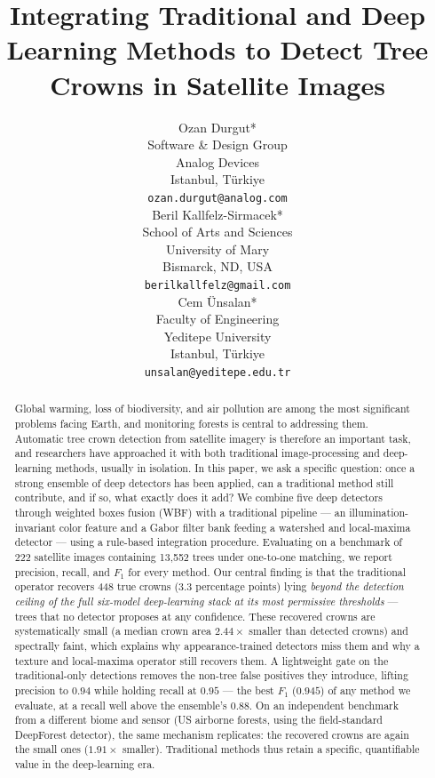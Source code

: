 \documentclass{article}
\title{Integrating Traditional and Deep Learning Methods to Detect Tree Crowns in Satellite Images}
\author{
  Ozan Durgut* \\
  Software \& Design Group \\
  Analog Devices \\
  Istanbul, Türkiye\\
  \texttt{ozan.durgut@analog.com} \\
   \And
  Beril Kallfelz-Sirmacek* \\
  School of Arts and Sciences \\
  University of Mary \\
  Bismarck, ND, USA\\
  \texttt{berilkallfelz@gmail.com} \\
  \And
  Cem Ünsalan*\\
  Faculty of Engineering \\
  Yeditepe University \\
  Istanbul, Türkiye\\
  \texttt{unsalan@yeditepe.edu.tr} \\
}
\begin{document}
\maketitle


\begin{abstract}
Global warming, loss of biodiversity, and air pollution are among the most significant problems facing Earth, and monitoring forests is central to addressing them. Automatic tree crown detection from satellite imagery is therefore an important task, and researchers have approached it with both traditional image-processing and deep-learning methods, usually in isolation. In this paper, we ask a specific question: once a strong ensemble of deep detectors has been applied, can a traditional method still contribute, and if so, what exactly does it add? We combine five deep detectors through weighted boxes fusion (WBF) with a traditional pipeline --- an illumination-invariant color feature and a Gabor filter bank feeding a watershed and local-maxima detector --- using a rule-based integration procedure. Evaluating on a benchmark of 222 satellite images containing 13{,}552 trees under one-to-one matching, we report precision, recall, and $F_1$ for every method. Our central finding is that the traditional operator recovers 448 true crowns (3.3 percentage points) lying \emph{beyond the detection ceiling of the full six-model deep-learning stack at its most permissive thresholds} --- trees that no detector proposes at any confidence. These recovered crowns are systematically small (a median crown area $2.44\times$ smaller than detected crowns) and spectrally faint, which explains why appearance-trained detectors miss them and why a texture and local-maxima operator still recovers them. A lightweight gate on the traditional-only detections removes the non-tree false positives they introduce, lifting precision to $0.94$ while holding recall at $0.95$ --- the best $F_1$ ($0.945$) of any method we evaluate, at a recall well above the ensemble's $0.88$. On an independent benchmark from a different biome and sensor (US airborne forests, using the field-standard DeepForest detector), the same mechanism replicates: the recovered crowns are again the small ones ($1.91\times$ smaller). Traditional methods thus retain a specific, quantifiable value in the deep-learning era.
\end{abstract}


\let\thefootnote\relax{}
\end{document}
